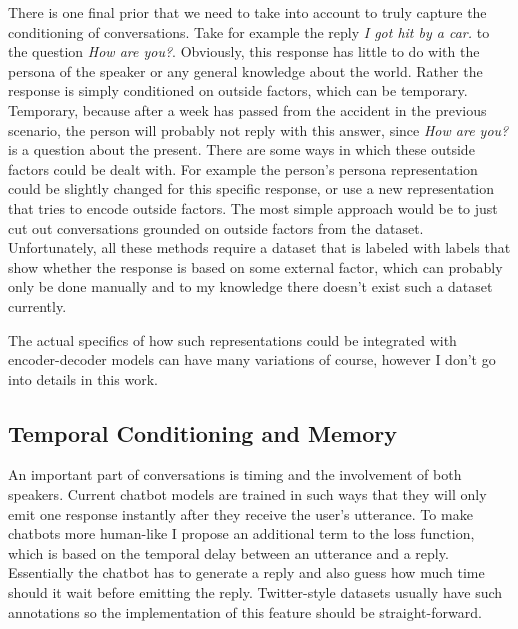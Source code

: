 \documentclass[12pt]{article}
\begin{document}
There is one final prior that we need to take into account to truly capture the conditioning of conversations. Take for example the reply \textit{I got hit by a car.} to the question \textit{How are you?}. Obviously, this response has little to do with the persona of the speaker or any general knowledge about the world. Rather the response is simply conditioned on outside factors, which can be temporary. Temporary, because after a week has passed from the accident in the previous scenario, the person will probably not reply with this answer, since \textit{How are you?} is a question about the present. There are some ways in which these outside factors could be dealt with. For example the person's persona representation could be slightly changed for this specific response, or use a new representation that tries to encode outside factors. The most simple approach would be to just cut out conversations grounded on outside factors from the dataset. Unfortunately, all these methods require a dataset that is labeled with labels that show whether the response is based on some external factor, which can probably only be done manually and to my knowledge there doesn't exist such a dataset currently.

The actual specifics of how such representations could be integrated with encoder-decoder models can have many variations of course, however I don't go into details in this work.

\subsection{Temporal Conditioning and Memory} \label{ssec:62}
An important part of conversations is timing and the involvement of both speakers. Current chatbot models are trained in such ways that they will only emit one response instantly after they receive the user's utterance. To make chatbots more human-like I propose an additional term to the loss function, which is based on the temporal delay between an utterance and a reply. Essentially the chatbot has to generate a reply and also guess how much time should it wait before emitting the reply. Twitter-style datasets usually have such annotations so the implementation of this feature should be straight-forward. 
\end{document}
